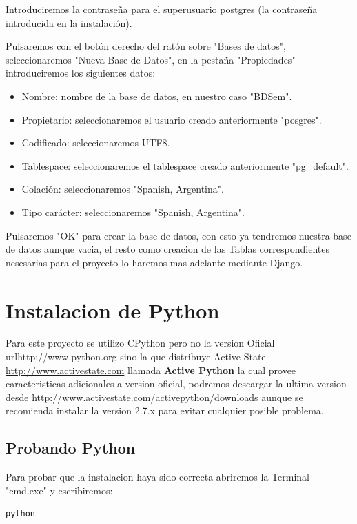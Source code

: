 Introduciremos la contraseña para el superusuario postgres
(la contraseña introducida en la instalación).

Pulsaremos con el botón derecho del ratón sobre "Bases de datos", seleccionaremos
"Nueva Base de Datos", en la pestaña "Propiedades" introduciremos los
siguientes datos:

\begin{itemize}
    \item Nombre: nombre de la base de datos, en nuestro caso "BDSem".
    \item Propietario: seleccionaremos el usuario creado anteriormente "posgres".
    \item Codificado: seleccionaremos UTF8.
    \item Tablespace: seleccionaremos el tablespace creado anteriormente "pg\_default".
    \item Colación: seleccionaremos "Spanish, Argentina".
    \item Tipo carácter: seleccionaremos "Spanish, Argentina".
\end{itemize}

Pulsaremos "OK" para crear la base de datos, con esto ya tendremos nuestra base
de datos aunque vacia, el resto como creacion de las Tablas correspondientes
nesesarias para el proyecto lo haremos mas adelante mediante Django.



\section{Instalacion de Python}

Para este proyecto se utilizo CPython pero no la version Oficial url{http://www.python.org}
sino la que distribuye Active State \url{http://www.activestate.com} llamada
{\bfseries Active Python} la cual provee caracteristicas adicionales a version oficial,
podremos descargar la ultima version desde \url{http://www.activestate.com/activepython/downloads}
aunque se recomienda instalar la version 2.7.x para evitar cualquier posible problema.

\subsection{Probando Python}
Para probar que la instalacion haya sido correcta abriremos la Terminal "cmd.exe"
y escribiremos:

\begin{lstlisting}[style=consola, numbers=none]
    python
\end{lstlisting} 

